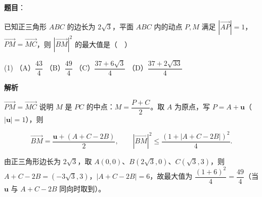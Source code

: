 \begin{answer}

\textbf{题目}：

已知正三角形 \(ABC\) 的边长为 \(2\sqrt{3}\)，平面 \(ABC\) 内的动点 \(P,M\) 满足 \(\left|\overrightarrow{AP}\right|=1\)，\(\overrightarrow{PM}=\overrightarrow{MC}\)，则 \(\left|\overrightarrow{BM}\right|^{2}\) 的最大值是（　）

\begin{gkopts}(1)
\task （A）\(\dfrac{43}{4}\)
\task （B）\(\dfrac{49}{4}\)
\task （C）\(\dfrac{37+6\sqrt{3}}{4}\)
\task （D）\(\dfrac{37+2\sqrt{33}}{4}\)
\end{gkopts}

\textbf{解析}

\(\overrightarrow{PM}=\overrightarrow{MC}\) 说明 \(M\) 是 \(PC\) 的中点：\(M=\dfrac{P+C}{2}\)。取 \(A\) 为原点，写 \(P=A+\boldsymbol u\)（\(|\boldsymbol u|=1\)），则

\nopagebreak[4]
\[
\overrightarrow{BM}=\frac{\boldsymbol u+(A+C-2B)}{2},\qquad
\left|\overrightarrow{BM}\right|^{2}\leqslant\frac{(1+|A+C-2B|)^{2}}{4}.
\]

由正三角形边长为 \(2\sqrt{3}\)，取 \(A(0,0)\)、\(B(2\sqrt{3},0)\)、\(C(\sqrt{3},3)\)，则 \(A+C-2B=(-3\sqrt{3},3)\)，\(|A+C-2B|=6\)，故最大值为 \(\dfrac{(1+6)^{2}}{4}=\dfrac{49}{4}\)（当 \(\boldsymbol u\) 与 \(A+C-2B\) 同向时取到）。


\end{answer}
